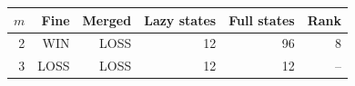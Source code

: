 \begin{tabular}{rrrrrr}
\toprule
$m$ & Fine & Merged & Lazy states & Full states & Rank \\
\midrule
2 & WIN & LOSS & 12 & 96 & 8 \\
3 & LOSS & LOSS & 12 & 12 & -- \\
\bottomrule
\end{tabular}
